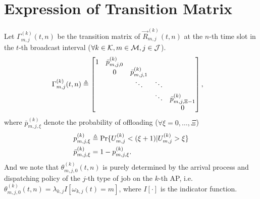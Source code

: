 \appendix
\section{Expression of Transition Matrix}
\label{append_1}

\begin{definition}
    Let ${\Gamma}^{(k)}_{m,j}(t,n)$ be the transition matrix of $\vec{R}^{(k)}_{m,j}(t,n)$ at the $n$-th time slot in the $t$-th broadcast interval ($\forall k\in\mathcal{K}, m\in\mathcal{M}, j\in\mathcal{J}$).
    \begin{align}
        \Gamma^{(k)}_{m,j}(t,n) &\triangleq
        \begin{bmatrix}
            1 & \bar{p}^{(k)}_{m,j,0} &                       &        &                           \\
            & 0                     & \bar{p}^{(k)}_{m,j,1} &        &                           \\
            &                       & \ddots                & \ddots &                           \\
            &                       &                       & \ddots & \bar{p}^{(k)}_{m,j,\Xi-1} \\
            &                       &                       &        & 0                         \\
        \end{bmatrix},
    \end{align}
    where $\bar{p}^{(k)}_{m,j,\xi}$ denote the probability of offloading ($\forall \xi=0,\dots,\Xi$)
    \begin{align}
        p^{(k)}_{m,j,\xi} &\triangleq \Pr\{U^{(k)}_{m,j} < (\xi+1) | U^{(k)}_{m,j}>\xi\}
        \\
        \bar{p}^{(k)}_{m,j,\xi} &= 1 - p^{(k)}_{m,j,\xi}.
    \end{align}
    And we note that $\theta^{(k)}_{m,j,0}(t,n)$ is purely determined by the arrival process and dispatching policy of the $j$-th type of job on the $k$-th AP, i.e. $\theta^{(k)}_{m,j,0}(t,n) = \lambda_{k,j} I[\omega_{k,j}(t) = m]$, where $I[\cdot]$ is the indicator function.


\end{definition}
